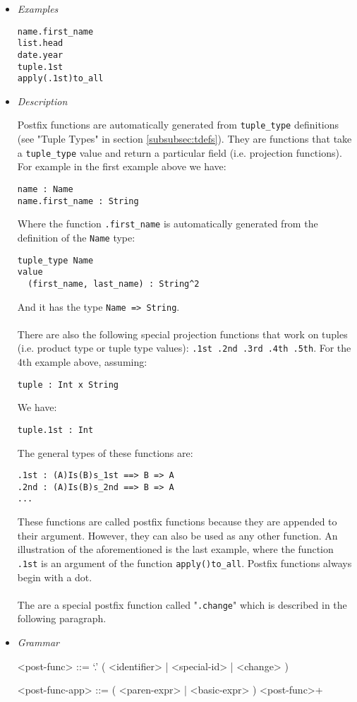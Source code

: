 \documentclass{article}
\begin{document}
\begin{itemize}

\item \textit{Examples}
\begin{verbatim}
name.first_name
list.head
date.year
tuple.1st
apply(.1st)to_all
\end{verbatim}

\item \textit{Description} 

Postfix functions are automatically generated from \texttt{tuple_type}
definitions (see "Tuple Types" in section \ref{subsubsec:tdefs}). They are
functions that take a \texttt{tuple_type} value and return a particular field
(i.e. projection functions). For example in the first example above we have:
\begin{verbatim}
name : Name
name.first_name : String
\end{verbatim}
Where the function \texttt{.first_name} is automatically generated from the
definition of the \texttt{Name} type:
\begin{verbatim}
tuple_type Name
value
  (first_name, last_name) : String^2
\end{verbatim}
And it has the type \texttt{Name => String}.
\\\\
There are also the following special projection functions that work on tuples
(i.e. product type or tuple type values): \texttt{.1st .2nd .3rd .4th .5th}.
For the 4th example above, assuming:
\begin{verbatim}
tuple : Int x String
\end{verbatim}
We have:
\begin{verbatim}
tuple.1st : Int
\end{verbatim}
The general types of these functions are:
\begin{verbatim}
.1st : (A)Is(B)s_1st ==> B => A
.2nd : (A)Is(B)s_2nd ==> B => A
...
\end{verbatim}
These functions are called postfix functions because they are appended to
their argument. However, they can also be used as any other function.
An illustration of the aforementioned is the last example, where the function
\texttt{.1st} is an argument of the function \texttt{apply()to_all}.
Postfix functions always begin with a dot.
\\\\
The are a special postfix function called "\texttt{.change}" which is described in
the following paragraph.

\item \textit{Grammar}
\begin{grammar}
<post-func> ::= `.' ( <identifier> | <special-id> | <change> )

<post-func-app> ::= ( <paren-expr> | <basic-expr> ) <post-func>+
\end{grammar}

\end{itemize}
\end{document}
